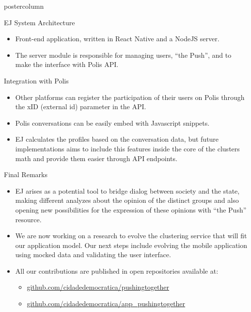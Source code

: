 \documentclass[final,hyperref={pdfpagelabels=false}]{beamer}
\begin{document}
\begin{frame}
\begin{columns}
\begin{column}{.49\textwidth}
\begin{beamercolorbox}[center,wd=\textwidth]{postercolumn}
\begin{minipage}[T]{.95\textwidth}
{\begin{block}{EJ System Architecture}
	\begin{itemize}
    \item Front-end application, written in React Native
    and a NodeJS server.

    \item The server module is responsible for managing users, ``the Push'', and
    to make the interface with Polis API.
  \end{itemize}

\end{block}

\begin{block}{Integration with Polis}
  \begin{itemize}
    \item Other platforms can register the participation of their users on Polis
    through the xID (external id) parameter in the API.

    \item Polis conversations can be easily embed with Javascript snippets.

    \item EJ calculates the profiles based on the conversation data, but future
    implementations aims to include this features inside the core of the clusters
    math and provide them easier through API endpoints.
  \end{itemize}
\end{block}
\begin{block}{Final Remarks}
  \begin{itemize}
    \item EJ arises as a potential tool to bridge dialog between society and
    the state, making different analyzes about the opinion of the distinct groups
    and also opening new possibilities for the expression of these opinions with ``the
    Push'' resource.

    \item We are now working on a research to evolve the clustering service that
    will fit our application model. Our next steps include evolving the
    mobile application using mocked data and validating the user interface.

    \item All our contributions are published in open repositories available at:
      \begin{itemize}
        \color{blue}
        \item \url{github.com/cidadedemocratica/pushingtogether}
        \item \url{github.com/cidadedemocratica/app_pushingtogether}
      \end{itemize}
  \end{itemize}
\end{block}
      }
        \end{minipage}
      \end{beamercolorbox}
    \end{column}
  \end{columns}
\end{frame}
\end{document}
